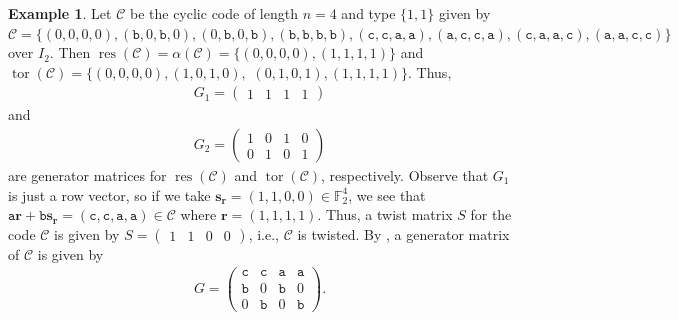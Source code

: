 \documentclass[12pt]{article}
\theoremstyle{definition}
\newtheorem{example}[example]{Example}
\theoremstyle{plain}
\begin{document}
\begin{example}  \label{ex: cyclic code of length 4}
Let $\mathcal{C}$ be the cyclic code of length $n = 4$ and type $\{ 1  , 1 \}$ given by $\mathcal{C} = \{ (0,0,0,0), ( \mathtt{b} , 0 , \mathtt{b} , 0  ) , ( 0, \mathtt{b} , 0 , \mathtt{b} ), ( \mathtt{b} , \mathtt{b} , \mathtt{b} , \mathtt{b})  , ( \mathtt{c} , \mathtt{c} , \mathtt{a} , \mathtt{a} ) , ( \mathtt{a} , \mathtt{c} , \mathtt{c} , \mathtt{a} ) , ( \mathtt{c} , \mathtt{a} , \mathtt{a} , \mathtt{c} ) , ( \mathtt{a} , \mathtt{a} , \mathtt{c} , \mathtt{c} )  \}$ over $I_2$. Then $\operatorname{res} ( \mathcal{C} ) = \alpha ( \mathcal{C} ) = \{ (0,0,0,0), (1,1,1,1) \}$ and $\operatorname{tor} ( \mathcal{C} ) = \{ (0,0,0,0) , (1,0,1,0),$ $(0,1,0,1) , (1,1,1,1) \}$. Thus,
\begin{align*}
G_1 = \left(
\begin{array}{cccc}
1 & 1 & 1 & 1
\end{array}
\right)
\end{align*}
and
\begin{align*}
G_2 = \left(
\begin{array}{cccc}
1 & 0 & 1 & 0  \\
0 & 1 & 0 & 1
\end{array}
\right)
\end{align*}
are generator matrices for $\operatorname{res} ( \mathcal{C} )$ and $\operatorname{tor} ( \mathcal{C} )$, respectively. Observe that $G_1$ is just a row vector, so if we take $\mathbf{s_r} = (1,1,0,0) \in \mathbb{F}_2^4$, we see that $\mathtt{a} \mathbf{r} + \mathtt{b} \mathbf{s_r} = ( \mathtt{c} , \mathtt{c} , \mathtt{a} , \mathtt{a} ) \in \mathcal{C}$ where $\mathbf{r} = (1,1,1,1)$. Thus, a twist matrix $S$ for the code $\mathcal{C}$ is given by $S = \left(
\begin{array}{cccc}
1 & 1 & 0 & 0
\end{array}
\right)$, i.e., $\mathcal{C}$ is twisted. By , a generator matrix of $\mathcal{C}$ is given by
\begin{align*}
G = \left(
\begin{array}{cccc}
\mathtt{c} & \mathtt{c} & \mathtt{a} & \mathtt{a}  \\
\mathtt{b} & 0 & \mathtt{b} & 0  \\
0 & \mathtt{b} & 0 & \mathtt{b}
\end{array}
\right) .
\end{align*}
\end{example}
\end{document}
